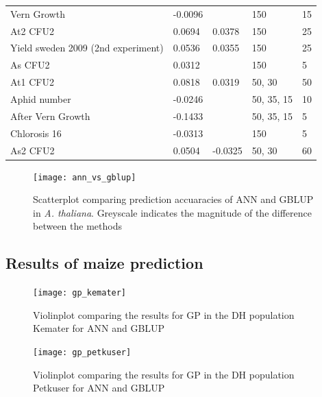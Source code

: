 \begin{longtable}{p{} p{} p{} p{} p{}}
  Vern Growth & -0.0096 & \color{red}{0.0422} & 150 & 15 \\
  At2 CFU2 & 0.0694 & 0.0378 & 150 & 25 \\
  Yield sweden 2009 (2nd experiment) & 0.0536 & 0.0355 & 150 & 25 \\
  As CFU2 & 0.0312 & \color{red}{0.035} & 150 & 5 \\
  At1 CFU2 & 0.0818 & 0.0319 & 50, 30 & 50 \\
  Aphid number & -0.0246 & \color{red}{0.029} & 50, 35, 15 & 10 \\
  After Vern Growth & -0.1433 & \color{red}{0.0057} & 50, 35, 15 & 5 \\
  Chlorosis 16 & -0.0313 & \color{red}{-0.0121} & 150 & 5 \\
  As2 CFU2 & 0.0504 & -0.0325 & 50, 30 & 60 \\
\bottomrule
\end{longtable}
\doublespacing



\begin{figure}[H]
 \centering\texttt{[image:  ann\_vs\_gblup]} \decoRule
\caption[Scatterplot comparing prediction accuaracies of ANN and GBLUP in \textit{A. thaliana}]{Scatterplot comparing prediction accuaracies of ANN and GBLUP in \textit{A. thaliana}. Greyscale indicates the magnitude of the difference between the methods}
\label{fig:annblup}
\end{figure}

\subsection{Results of maize prediction}


\begin{figure}[H]
  \centering \texttt{[image: gp\_kemater]}
  \decoRule
\caption[Violinplot comparing the results for GP in the DH population Kemater for ANN and GBLUP]{Violinplot comparing the results for GP in the DH population Kemater for ANN and GBLUP }
\label{fig:ke_ann}
\end{figure}



\begin{figure}[H]
  \centering \texttt{[image: gp\_petkuser]}
  \decoRule
  \caption[Violinplot comparing the results for GP in the DH population Petkuser for ANN and GBLUP]{Violinplot comparing the results for GP in the DH population Petkuser for ANN and GBLUP }
\label{fig:pe_ann}
\end{figure}


